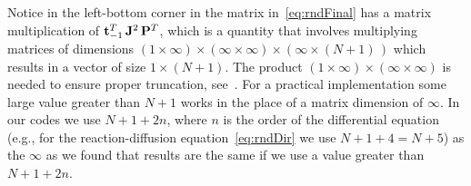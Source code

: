 \documentclass[%
secnumarabic,%
 amssymb, amsmath,%
 aps,prf,superscriptaddress,longbibliography
frontmatterverbose,
]{revtex4-2}
\newcommand{\ghmargin}[1]{\marginpar{\color{blue}\tiny\ttfamily{GH:} #1}}
\begin{document}
Notice in the left-bottom corner in the matrix in~\eqref{eq:rndFinal} has a matrix multiplication of $\mathbf{t}_{-1}^T \,\mathbf J^2\,\mathbf{P}^T$, which is a quantity that involves multiplying matrices of dimensions $(1\times \infty) \times (\infty \times \infty)\times (\infty \times (N +1)\,)$ which results in a vector of size $1\times (N + 1)$. The product $(1\times \infty) \times (\infty \times \infty)$ is needed to ensure proper truncation, see~\cite[last paragraph of Section 2.4]{OlvTowSIAM2013}. For a practical implementation some large value greater than $N + 1$ works in the place of a matrix dimension of $\infty$. In our codes we use $N + 1 + 2n$, where $n$ is the order of the differential equation (e.g., for the reaction-diffusion equation~\eqref{eq:rndDir} we use $N + 1 + 4 = N + 5$) as the $\infty$ as we found that results are the same if we use a value greater than $N + 1 + 2n$.

\end{document}
